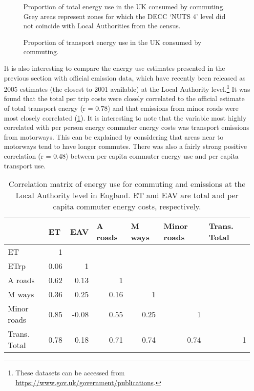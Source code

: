 \begin{figure}
 \caption[Proportion of total energy use in the UK consumed by commuting]
 {Proportion of total energy use in the UK consumed by commuting.
 Grey areas represent zones for which the DECC `NUTS 4' level did not coincide with
 Local Authorities from the census.
 }
 \label{fpropten}
\end{figure}

\begin{figure}
 \caption{Proportion of transport energy use in the UK consumed by commuting.}
 \label{fproptrans}
\end{figure}


It is also interesting to compare the energy use estimates presented in the
previous section with official emission data, which have recently been
released as 2005 estimates (the closest to 2001 available) at the Local Authority
level.\footnote{These datasets can be accessed from {\color{blue}
\href{https://www.gov.uk/government/publications/local-authority-emissions-estimates}
{https://www.gov.uk/government/publications}}.
}
It was found that the total per trip costs were closely correlated to the
official estimate of total transport energy (r = 0.78) and that emissions
from minor roads were most closely correlated (\cref{tco2cor}). 
It is interesting to note that the variable most highly correlated
with per person energy commuter energy costs was transport emissions
from motorways. This can be explained by considering that areas near to
motorways tend to have longer commutes. There was also a fairly strong
positive correlation (r = 0.48) between per capita commuter energy use
and per capita transport use.

\begin{table}[htbp]
\caption[Correlation matrix of energy use for commuting and emissions]
{Correlation matrix of energy use for commuting and emissions at the Local
Authority level in England. ET and EAV are total and per capita commuter energy
costs, respectively.}
\begin{tabular}{lrrrrrr}
\toprule
 & \multicolumn{1}{l}{ET} & \multicolumn{1}{l}{EAV} & \multicolumn{1}{l}{A roads} & \multicolumn{1}{l}{M ways} & \multicolumn{1}{l}{Minor roads} & \multicolumn{1}{l}{Trans. Total} \\
 \midrule
ET & 1 &  &  &  &  &  \\
ETrp & 0.06 & 1 &  &  &  &  \\
A roads & 0.62 & 0.13 & 1 &  &  &  \\
M ways & 0.36 & 0.25 & 0.16 & 1 &  &  \\
Minor roads & 0.85 & -0.08 & 0.55 & 0.25  & 1 &  \\
Trans. Total & 0.78 & 0.18 & 0.71 & 0.74 & 0.74 & 1 \\
\bottomrule
\end{tabular}
\label{tco2cor}
\end{table}


